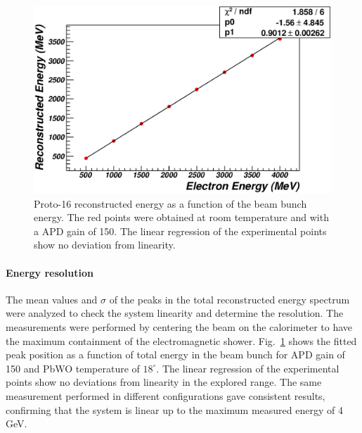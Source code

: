 \begin{figure}
\includegraphics[width=1.0\columnwidth]{./fig/btf_linearity_1876_2_6.eps}
\caption{Proto-16 reconstructed energy as a function of the beam bunch
  energy. The red points were obtained at room temperature and with a
APD gain of 150. The linear regression of the experimental points show
no deviation from linearity.}
\label{fig:btf_linearity}
\end{figure}

\paragraph{Energy resolution}

The mean values and $\sigma$ of the peaks in the total reconstructed
energy spectrum were analyzed to check the system linearity and
determine the resolution. The measurements were performed by centering
the beam on the calorimeter to have the maximum containment of the
electromagnetic shower. 
Fig.~\ref{fig:btf_linearity} shows the fitted
peak position as a function of total energy in the beam bunch for APD
gain of 150 and PbWO temperature of $18^{\circ}$. The linear
regression of the experimental points show no deviations from
linearity in the explored range. The same measurement performed in
different configurations gave consistent results, confirming that the
system is linear up to the maximum measured energy of 4 GeV.

